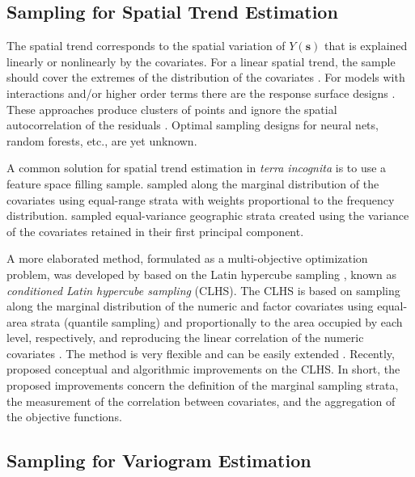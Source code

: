 \subsection{Sampling for Spatial Trend Estimation}

The spatial trend corresponds to the spatial variation of $Y(\boldsymbol{s})$ that is explained linearly or 
nonlinearly by the covariates. For a linear spatial trend, the sample should cover the extremes of the 
distribution of the covariates \cite{Mueller2007}. For models with interactions and/or higher order terms there 
are the response surface designs \cite{BoxEtAl1951, LeschEtAl1995}. These approaches produce clusters of points 
and ignore the spatial autocorrelation of the residuals \cite{BrusEtAl2007a, Mueller2007}. Optimal sampling 
designs for neural nets, random forests, etc., are yet unknown.

A common solution for spatial trend estimation in \emph{terra incognita} is to use a feature space filling 
sample. \citet{HenglEtAl2003a} sampled along the marginal distribution of the covariates using equal-range 
strata with weights proportional to the frequency distribution. \citet{MinasnyEtAl2007a} sampled equal-variance 
geographic strata created using the variance of the covariates retained in their first principal component.

A more elaborated method, formulated as a multi-objective optimization problem, was developed by 
\citet{MinasnyEtAl2006b} based on the Latin hypercube sampling \cite{McKayEtAl1979}, known as \emph{conditioned 
Latin hypercube sampling} (CLHS). The CLHS is based on sampling along the marginal distribution of the numeric 
and factor covariates using equal-area strata (quantile sampling) and proportionally to the area occupied by 
each level, respectively, and reproducing the linear correlation of the numeric covariates 
\cite{MinasnyEtAl2006b}. The method is very flexible and can be easily extended \cite{MinasnyEtAl2010a, 
RoudierEtAl2012}. Recently, \citet{Samuel-RosaEtAl} proposed conceptual and algorithmic improvements on the 
CLHS. In short, the proposed improvements concern the definition of the marginal sampling strata, the 
measurement of the correlation between covariates, and the aggregation of the objective functions.

\subsection{Sampling for Variogram Estimation}

